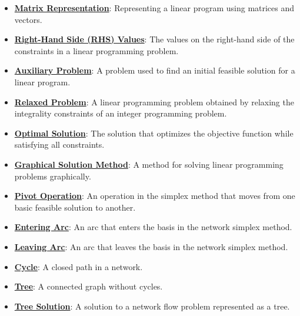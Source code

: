 \documentclass{article}%
\begin{document}
\begin{itemize}[leftmargin=*]
\item \href{https://www.math.purdue.edu/~yipn/421/2024-11-14-NetAppls.pdf#page=7}{\textbf{Matrix Representation}}: Representing a linear program using matrices and vectors.%
\item \href{https://www.math.purdue.edu/~yipn/421/2024-11-14-NetAppls.pdf#page=7}{\textbf{Right{-}Hand Side (RHS) Values}}: The values on the right-hand side of the constraints in a linear programming problem.%
\item \href{https://www.math.purdue.edu/~yipn/421/2024-11-14-NetAppls.pdf#page=7}{\textbf{Auxiliary Problem}}: A problem used to find an initial feasible solution for a linear program.%
\item \href{https://www.math.purdue.edu/~yipn/421/2024-11-14-NetAppls.pdf#page=7}{\textbf{Relaxed Problem}}: A linear programming problem obtained by relaxing the integrality constraints of an integer programming problem.%
\item \href{https://www.math.purdue.edu/~yipn/421/2024-11-14-NetAppls.pdf#page=2}{\textbf{Optimal Solution}}: The solution that optimizes the objective function while satisfying all constraints.%
\item \href{https://www.math.purdue.edu/~yipn/421/2024-11-14-NetAppls.pdf#page=7}{\textbf{Graphical Solution Method}}: A method for solving linear programming problems graphically.%
\item \href{https://www.math.purdue.edu/~yipn/421/2024-11-14-NetAppls.pdf#page=7}{\textbf{Pivot Operation}}: An operation in the simplex method that moves from one basic feasible solution to another.%
\item \href{https://www.math.purdue.edu/~yipn/421/2024-11-14-NetAppls.pdf#page=7}{\textbf{Entering Arc}}: An arc that enters the basis in the network simplex method.%
\item \href{https://www.math.purdue.edu/~yipn/421/2024-11-14-NetAppls.pdf#page=7}{\textbf{Leaving Arc}}: An arc that leaves the basis in the network simplex method.%
\item \href{https://www.math.purdue.edu/~yipn/421/2024-11-14-NetAppls.pdf#page=7}{\textbf{Cycle}}: A closed path in a network.%
\item \href{https://www.math.purdue.edu/~yipn/421/2024-11-14-NetAppls.pdf#page=7}{\textbf{Tree}}: A connected graph without cycles.%
\item \href{https://www.math.purdue.edu/~yipn/421/2024-11-14-NetAppls.pdf#page=7}{\textbf{Tree Solution}}: A solution to a network flow problem represented as a tree.%

\end{itemize}
\end{document}
